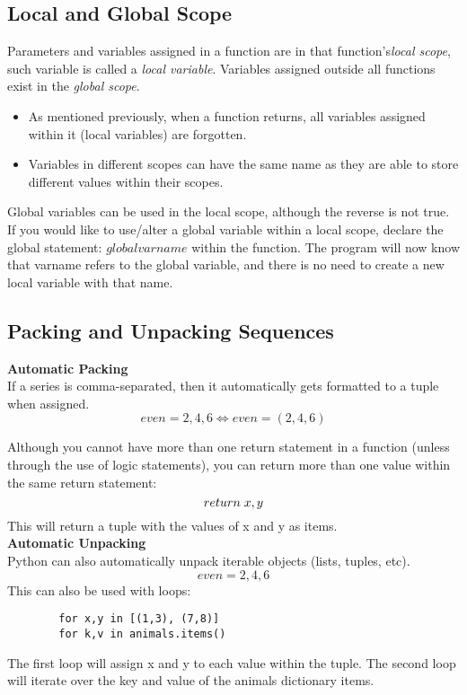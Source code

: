 \subsection{Local and Global Scope}
Parameters and variables assigned in a function are in that function's\textit{local scope}, such variable is called a \textit{local variable}. Variables assigned outside all functions exist in the \textit{global scope}.
\begin{itemize}
    \item As mentioned previously, when a function returns, all variables assigned within it (local variables) are forgotten.
    \item Variables in different scopes can have the same name as they are able to store different values within their scopes.
\end{itemize}
Global variables can be used in the local scope, although the reverse is not true.\\
If you would like to use/alter a global variable within a local scope, declare the global statement: $global varname$ within the function. The program will now know that varname refers to the global variable, and there is no need to create a new local variable with that name.

\subsection{Packing and Unpacking Sequences}
\textbf{Automatic Packing}\\
If a series is comma-separated, then it automatically gets formatted to a tuple when assigned.
\[even = 2,4,6 \iff even = (2,4,6)\]

Although you cannot have more than one return statement in a function (unless through the use of logic statements), you can return more than one value within the same return statement:
\[return \hspace{0.1cm}x,y\]
This will return a tuple with the values of x and y as items.
\\[0.35cm]
\textbf{Automatic Unpacking}\\
Python can also automatically unpack iterable objects (lists, tuples, etc).
\[even = 2,4,6\]
This can also be used with loops:
\begin{center}
    \begin{verbatim}
        for x,y in [(1,3), (7,8)]
        for k,v in animals.items()
    \end{verbatim}
\end{center}
The first loop will assign x and y to each value within the tuple.
The second loop will iterate over the key and value of the animals dictionary items.

